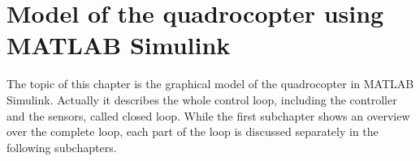 \section{Model of the quadrocopter using MATLAB Simulink}\label{chapter_MATLAB_MODEL}

The topic of this chapter is the graphical model of the quadrocopter in MATLAB Simulink.
Actually it describes the whole control loop, including the controller and the sensors, called closed loop. While the first subchapter shows an overview over the complete loop, each part of the loop is discussed separately in the following subchapters.

\pagestyle{fancy}

\clearpage %

\pagestyle{fancy}

\clearpage %

\pagestyle{fancy}

\clearpage %

\pagestyle{fancy}

\clearpage %

\pagestyle{fancy}

\clearpage %


